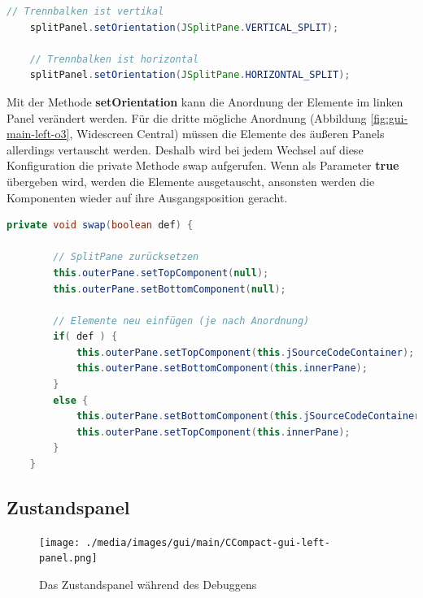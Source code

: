 \begin{lstlisting}[language=JAVA]
	// Trennbalken ist vertikal
	splitPanel.setOrientation(JSplitPane.VERTICAL_SPLIT);
	
	// Trennbalken ist horizontal
	splitPanel.setOrientation(JSplitPane.HORIZONTAL_SPLIT);
\end{lstlisting}

Mit der Methode \textbf{setOrientation} kann die Anordnung der Elemente im linken Panel verändert werden. Für die dritte mögliche Anordnung (Abbildung \ref{fig:gui-main-left-o3}, \glqq{}Widescreen Central\grqq{}) müssen die Elemente des äußeren Panels allerdings vertauscht werden. Deshalb wird bei jedem Wechsel auf diese Konfiguration die private Methode \glqq{}swap\grqq{} aufgerufen. Wenn als Parameter \textbf{true} übergeben wird, werden die Elemente ausgetauscht, ansonsten werden die Komponenten wieder auf ihre Ausgangsposition geracht.

\begin{lstlisting}[language=JAVA]
	private void swap(boolean def) {
		
		// SplitPane zurücksetzen
		this.outerPane.setTopComponent(null);
		this.outerPane.setBottomComponent(null);
		
		// Elemente neu einfügen (je nach Anordnung)
		if( def ) {
			this.outerPane.setTopComponent(this.jSourceCodeContainer);
			this.outerPane.setBottomComponent(this.innerPane);
		}
		else {
			this.outerPane.setBottomComponent(this.jSourceCodeContainer);
			this.outerPane.setTopComponent(this.innerPane);
		}
	}
\end{lstlisting}

\subsection{Zustandspanel}
\label{sec:gui-main-left-zust}

\begin{figure}[htbp] 
  \centering
     \texttt{[image: ./media/images/gui/main/CCompact-gui-left-panel.png]}
  \caption{Das Zustandspanel während des Debuggens}
  \label{fig:gui-main-left-panel}
\end{figure}

